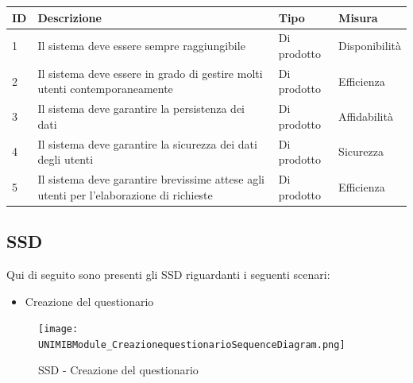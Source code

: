\documentclass[12pt]{article}
\begin{document}
	\begin{table}[H]
		\begin{adjustbox}{max width=1.1\textwidth,center}
			\begin{tabular}{|l|l|l|l|}
				\hline
				\rowcolor[HTML]{3531FF} 
				{\color[HTML]{FFFFFF} ID} & {\color[HTML]{FFFFFF} Descrizione}                                                      & {\color[HTML]{FFFFFF} Tipo} & {\color[HTML]{FFFFFF} Misura} \\ \hline
				1                         & Il sistema deve essere sempre raggiungibile                                             & Di prodotto                 & Disponibilità                 \\ \hline
				2                         & Il sistema deve essere in grado di gestire molti utenti contemporaneamente              & Di prodotto                 & Efficienza                    \\ \hline
				3                         & Il sistema deve garantire la persistenza dei dati                                       & Di prodotto                 & Affidabilità                  \\ \hline
				4                         & Il sistema deve garantire la sicurezza dei dati degli utenti                            & Di prodotto                 & Sicurezza                     \\ \hline
				5                         & Il sistema deve garantire brevissime attese agli utenti per l'elaborazione di richieste & Di prodotto                 & Efficienza                    \\ \hline
			\end{tabular}
		\end{adjustbox}
	\end{table}
	
	
	
	
	
	
	\newpage
	\subsection{SSD}
	Qui di seguito sono presenti gli SSD riguardanti i seguenti scenari:
	\begin{itemize}
		\item Creazione del questionario
	\end{itemize}
	
	\begin{figure}[H]
		\centering
		\texttt{[image: UNIMIBModule\_CreazionequestionarioSequenceDiagram.png]}
		\caption{SSD - Creazione del questionario}
	\end{figure}
	
\end{document}
